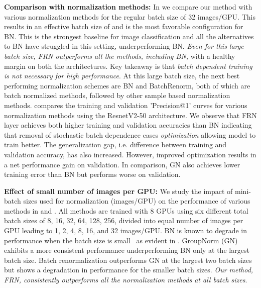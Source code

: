 \documentclass[10pt,twocolumn,letterpaper]{article}
\newcommand{\papername}{FRN}
\newcommand{\batchnorm}{BN}
\newcommand{\groupnorm}{GN}
\begin{document}
\medskip
\noindent
\textbf{Comparison with normalization methods:} In  we compare our method with various normalization methods for the regular batch size of 32 images/GPU. This results in an effective batch size of  and is the most favorable configuration for \batchnorm{}. This is the strongest baseline for image classification and all the alternatives to \batchnorm{} have struggled in this setting, underperforming \batchnorm{}. \emph{Even for this large batch size, \papername{} outperforms all the methods, including \batchnorm{},} with a healthy margin on both the architectures. Key takeaway is that \emph{batch dependent training is not necessary for high performance}. At this large batch size, the next best performing normalization schemes are \batchnorm{} and BatchRenorm, both of which are batch normalized methods, followed by other sample based normalization methods.  compares the training and validation 'Precision@1' curves for various normalization methods using the ResnetV2-50 architecture. We observe that \papername{} layer achieves both higher training and validation accuracies than BN indicating that removal of stochastic batch dependence eases \emph{optimization} allowing model to train better. The generalization gap, i.e. difference between training and validation accuracy, has also increased. However, improved optimization results in a net performance gain on validation. In comparison, GN also achieves lower training error than BN but performs worse on validation.

\medskip
\noindent
\textbf{Effect of small number of images per GPU:}
We study the impact of mini-batch sizes used for normalization (images/GPU) on the performance of various methods in  and . All methods are trained with 8 GPUs using six different total batch sizes of 8, 16, 32, 64, 128, 256, divided into equal number of images per GPU leading to 1, 2, 4, 8, 16, and 32 images/GPU. \batchnorm{} is known to degrade in performance when the batch size is small~\cite{batchrenorm, evalnorm} as evident in . GroupNorm (\groupnorm{}) exhibits a more consistent performance underperforming \batchnorm{} only at the largest batch size. Batch renormalization outperforms \groupnorm{} at the largest two batch sizes but shows a degradation in performance for the smaller batch sizes. \emph{Our method, \papername{}, consistently outperforms all the normalization methods at all batch sizes}. 
\end{document}
